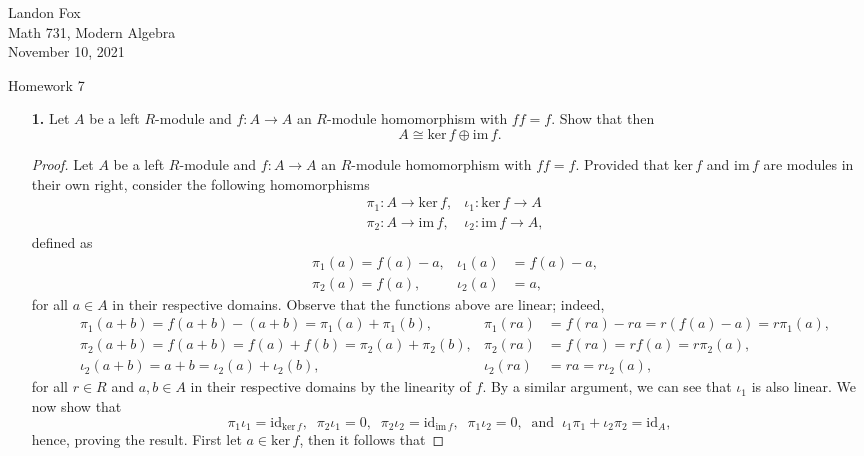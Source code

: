 \documentclass[ 12pt ]{article}
\begin{document}
\noindent Landon Fox \\
\noindent Math 731, Modern Algebra \\
\noindent November 10, 2021

\begin{center}
\Large Homework 7
\end{center}

\begin{enumerate}
	\item[\textbf{1.}] Let $A$ be a left $R$-module and $f : A \to A$ an $R$-module homomorphism with $ff = f$. Show that then $$A \cong \mathrm{ker}\, f \oplus \mathrm{im}\, f.$$

		\begin{proof}
			Let $A$ be a left $R$-module and $f : A \to A$ an $R$-module homomorphism with $ff = f$. Provided that $\mathrm{ker}\, f$ and $\mathrm{im}\, f$ are modules in their own right, consider the following homomorphisms
			\begin{align*}
				&\pi_1 : A \to \mathrm{ker}\, f, & \iota_1 : \mathrm{ker}\, f \to A \\
				&\pi_2 : A \to \mathrm{im}\, f, & \iota_2 : \mathrm{im}\, f \to A,
			\end{align*}
			defined as
			\begin{align*}
				&\pi_1(a) = f(a) - a, & \iota_1(a) &= f(a) - a, \\
				&\pi_2(a) = f(a), & \iota_2(a) &= a,
			\end{align*}
			for all $a \in A$ in their respective domains. Observe that the functions above are linear; indeed,
			\begin{align*}
				&\pi_1(a + b) = f(a + b) - (a + b) = \pi_1(a) + \pi_1(b), & \pi_1(ra) &= f(ra) - ra = r(f(a) - a) = r\pi_1(a), \\
				&\pi_2(a + b) = f(a + b) = f(a) + f(b) = \pi_2(a) + \pi_2(b), & \pi_2(ra) &= f(ra) = rf(a) = r\pi_2(a), \\
				&\iota_2(a + b) = a + b = \iota_2(a) + \iota_2(b), & \iota_2(ra) &= ra = r\iota_2(a),
			\end{align*}
			for all $r \in R$ and $a, b \in A$ in their respective domains by the linearity of $f$. By a similar argument, we can see that $\iota_1$ is also linear. We now show that $$\pi_1 \iota_1 = \mathrm{id}_{\mathrm{ker}\, f},\;\; \pi_2 \iota_1 = 0,\;\; \pi_2 \iota_2 = \mathrm{id}_{\mathrm{im}\, f},\;\; \pi_1 \iota_2 = 0,\;\; \mathrm{and}\;\; \iota_1 \pi_1 + \iota_2 \pi_2 = \mathrm{id}_A,$$ hence, proving the result. First let $a \in \mathrm{ker}\, f$, then it follows that

\end{proof}
\end{enumerate}
\end{document}
